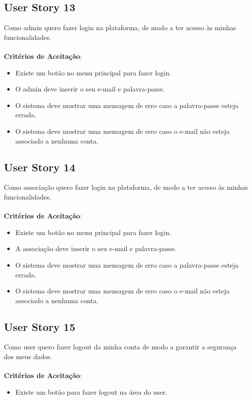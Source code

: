 \documentclass[a4paper,11pt]{article}
\begin{document}
\subsection{User Story 13}
Como admin quero fazer login na plataforma, de modo a ter acesso às minhas funcionalidades.\\\\
\textbf{Critérios de Aceitação}:
\begin{itemize}
  \item Existe um botão no menu principal para fazer login.
  \item O admin deve inserir o seu e-mail e palavra-passe.
  \item O sistema deve mostrar uma mensagem de erro caso a palavra-passe esteja errada.
  \item O sistema deve mostrar uma mensagem de erro caso o e-mail não esteja associado a nenhuma conta.
\end{itemize}

\subsection{User Story 14}
Como associação quero fazer login na plataforma, de modo a ter acesso às minhas funcionalidades.\\\\
\textbf{Critérios de Aceitação}:
\begin{itemize}
  \item Existe um botão no menu principal para fazer login.
  \item A associação deve inserir o seu e-mail e palavra-passe.
  \item O sistema deve mostrar uma mensagem de erro caso a palavra-passe esteja errada.
  \item O sistema deve mostrar uma mensagem de erro caso o e-mail não esteja associado a nenhuma conta.
\end{itemize}

\subsection{User Story 15}
Como user quero fazer logout da minha conta de modo a garantir a segurança dos meus dados.\\\\
\textbf{Critérios de Aceitação}:
\begin{itemize}
  \item Existe um botão para fazer logout na área do user.
\end{itemize}
\end{document}
